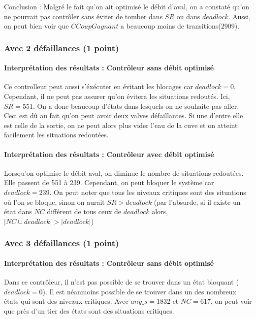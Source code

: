 \documentclass[a4paper]{book}
\begin{document}
Conclusion : Malgré le fait qu'on ait optimisé le débit d'aval, on a constaté qu'on ne pourrait pas contrôler sans éviter de tomber dans $SR$ ou dans $deadlock$.
Aussi, on peut bien voir que $CCoupGagnant$ a beaucoup moins de transitions($2909$).

\subsubsection{Avec 2 défaillances (1 point)}


%
%
%
\paragraph{Interprétation des résultats : Contrôleur sans débit optimisé}
Ce controlleur peut aussi s'éxécuter en évitant les blocages car $deadlock = 0$. Cependant, il ne peut pas assurer qu'on évitera les situations redoutés.
Ici, $SR = 551$. On a donc beaucoup d'états dans lesquels on ne souhaite pas aller. Ceci est dû au fait qu'on peut avoir deux valves défaillantes.
Si une d'entre elle est celle de la sortie, on ne peut alors plus vider l'eau de la cuve et on atteint facilement les situations redoutées.

\paragraph{Interprétation des résultats : Contrôleur avec débit optimisé}

Lorsqu'on optimise le débit aval, on diminue le nombre de situations redoutées. Elle passent de 551 à 239. Cependant, on peut bloquer le système
car $deadlock = 239$. On peut noter que tous les niveaux critiques sont des situations où l'on se bloque, sinon on aurait $SR > deadlock$ (par l'absurde, si il existe un état dans $NC$ différent de tous ceux de $deadlock$ alors, $|NC \cup deadlock| > |deadlock|$)


\subsubsection{Avec 3 défaillances (1 point)}


%
%
%
\paragraph{Interprétation des résultats : Contrôleur sans débit optimisé}
Dans ce contrôleur, il n'est pas possible de se trouver dans un état bloquant ($deadlock = 0$). Il est néanmoins possible de se trouver dans un des nombreux états qui sont des niveaux critiques.
Avec $any\_s = 1832$ et $NC=617$, on peut voir que près d'un tier des états sont des situations critiques.
\end{document}
